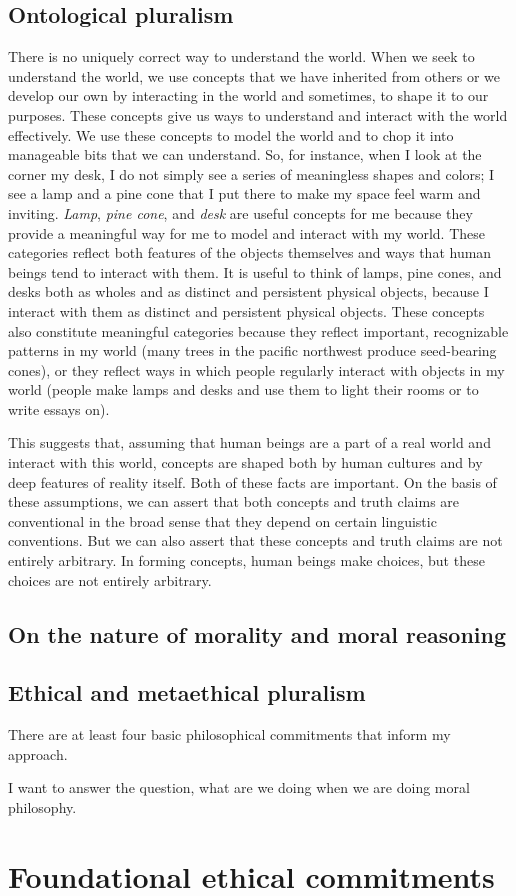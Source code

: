 \section{Ontological pluralism}
\label{sec:ont_plural}
There is no uniquely correct way to understand the world.
When we seek to understand the world, we use concepts that we have inherited
from others or we develop our own by interacting in the world and sometimes, to
shape it to our purposes.
These concepts give us ways to understand and interact with the world
effectively.
We use these concepts to model the world and to chop it into manageable bits
that we can understand.
So, for instance, when I look at the corner my desk, I do not simply see a
series of meaningless shapes and colors; I see a lamp and a pine cone that I
put there to make my space feel warm and inviting.
\emph{Lamp}, \emph{pine cone}, and \emph{desk} are useful concepts for me because they
provide a meaningful way for me to model and interact with my world.
These categories reflect both features of the objects themselves and ways that
human beings tend to interact with them.
It is useful to think of lamps, pine cones, and desks both as wholes and as
distinct and persistent physical objects, because I interact with them as
distinct and persistent physical objects.
These concepts also constitute meaningful categories because they reflect
important, recognizable patterns in my world (many trees in the pacific
northwest produce seed-bearing cones), or they reflect ways in which people
regularly interact with objects in my world (people make lamps and desks and
use them to light their rooms or to write essays on).

This suggests that, assuming that human beings are a part of a real world and
interact with this world, concepts are shaped both by human cultures and by deep
features of reality itself.
Both of these facts are important.
On the basis of these assumptions, we can assert that both concepts and truth
claims are conventional in the broad sense that they depend on certain linguistic
conventions.
But we can also assert that these concepts and truth claims are not entirely
arbitrary.
In forming concepts, human beings make choices, but these choices are not
entirely arbitrary.
\section{On the nature of morality and moral reasoning}
\label{sec:nat_mor}
\section{Ethical and metaethical pluralism}
\label{sec:eth_plur}
There are at least four basic philosophical commitments that inform my approach.

I want to answer the question, what are we doing when we are doing moral
philosophy.
\chapter{Foundational ethical commitments}
\label{ch:eth_com}
